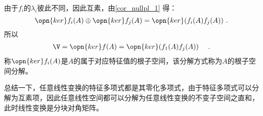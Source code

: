 由于$f_i$的$\lambda_i$彼此不同，因此互素，由\autoref{cor_nullpl_1} 得：
\begin{equation}
\opn{ker}f_i(A)\oplus \opn{ker}f_j(A)=\opn{ker}(f_i(A)f_j(A))~.
\end{equation}
所以
\begin{equation}
\begin{aligned}
\V=\opn{ker}f(A)&=\opn{ker}(f_1(A)f_j(A))
\end{aligned}
~.
\end{equation}
称$\opn{ker}f_i(A)$是$A$的属于对应特征值的根子空间，该分解方式称为$A$的根子空间分解。

总结一下，任意线性变换的特征多项式都是其零化多项式，由于特征多项式可以分解为互素项，因此任意线性空间都可以分解为任意线性变换的不变子空间之直和，此时线性变换是分块对角矩阵。
